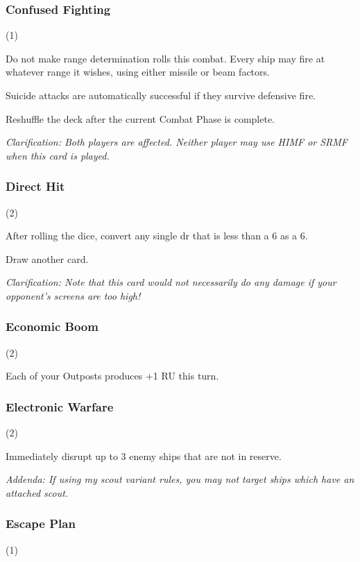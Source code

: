 \subsubsection{Confused Fighting} (1)


Do not make range determination rolls this combat. Every ship may fire at whatever range it wishes, using either missile or beam factors.

Suicide attacks are automatically successful if they survive defensive fire.

Reshuffle the deck after the current Combat Phase is complete.

\textit{Clarification: Both players are affected. Neither player may use HIMF or SRMF when this card is played.}

\subsubsection{Direct Hit} (2)


After rolling the dice, convert any single dr that is less than a 6 as a 6.

Draw another card.

\textit{Clarification: Note that this card would not necessarily do any damage if your opponent's screens are too high!}

\subsubsection{Economic Boom} (2)


Each of your Outposts produces +1 RU this turn.

\subsubsection{Electronic Warfare} (2)


Immediately disrupt up to 3 enemy ships that are not in reserve.

\textit{Addenda: If using my scout variant rules, you may not target ships which have an attached scout.}

\subsubsection{Escape Plan} (1)

